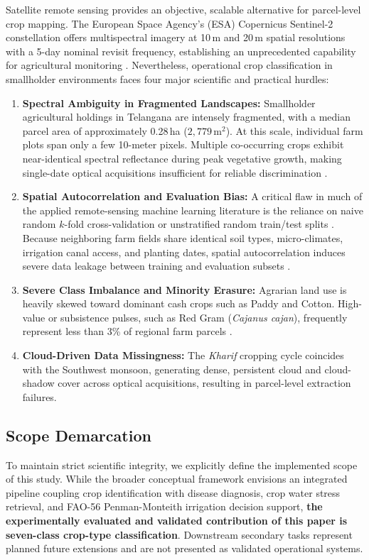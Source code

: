 \documentclass[runningheads]{llncs}
\begin{document}
Satellite remote sensing provides an objective, scalable alternative for parcel-level crop mapping. The European Space Agency's (ESA) Copernicus Sentinel-2 constellation offers multispectral imagery at 10\,m and 20\,m spatial resolutions with a 5-day nominal revisit frequency, establishing an unprecedented capability for agricultural monitoring \cite{defourny2019,inglada2015}. Nevertheless, operational crop classification in smallholder environments faces four major scientific and practical hurdles:
\begin{enumerate}
    \item \textbf{Spectral Ambiguity in Fragmented Landscapes:} Smallholder agricultural holdings in Telangana are intensely fragmented, with a median parcel area of approximately 0.28\,ha ($2{,}779\,\text{m}^2$). At this scale, individual farm plots span only a few 10-meter pixels. Multiple co-occurring crops exhibit near-identical spectral reflectance during peak vegetative growth, making single-date optical acquisitions insufficient for reliable discrimination \cite{jin2019,vuolo2018}.
    \item \textbf{Spatial Autocorrelation and Evaluation Bias:} A critical flaw in much of the applied remote-sensing machine learning literature is the reliance on naive random $k$-fold cross-validation or unstratified random train/test splits \cite{meyer2018,roberts2017}. Because neighboring farm fields share identical soil types, micro-climates, irrigation canal access, and planting dates, spatial autocorrelation induces severe data leakage between training and evaluation subsets \cite{roberts2017}.
    \item \textbf{Severe Class Imbalance and Minority Erasure:} Agrarian land use is heavily skewed toward dominant cash crops such as Paddy and Cotton. High-value or subsistence pulses, such as Red Gram (\emph{Cajanus cajan}), frequently represent less than 3\% of regional farm parcels \cite{maxwell2018}.
    \item \textbf{Cloud-Driven Data Missingness:} The \emph{Kharif} cropping cycle coincides with the Southwest monsoon, generating dense, persistent cloud and cloud-shadow cover across optical acquisitions, resulting in parcel-level extraction failures.
\end{enumerate}

\subsection{Scope Demarcation}
To maintain strict scientific integrity, we explicitly define the implemented scope of this study. While the broader conceptual framework envisions an integrated pipeline coupling crop identification with disease diagnosis, crop water stress retrieval, and FAO-56 Penman-Monteith irrigation decision support, \textbf{the experimentally evaluated and validated contribution of this paper is seven-class crop-type classification}. Downstream secondary tasks represent planned future extensions and are not presented as validated operational systems.
\end{document}
